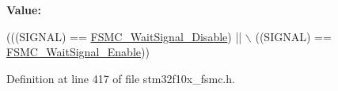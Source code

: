 {\bfseries Value\+:}
\begin{DoxyCode}
(((SIGNAL) == \hyperlink{group___f_s_m_c___wait___signal_ga6ea66c8ddee073281c421533bdff7e19}{FSMC\_WaitSignal\_Disable}) || \(\backslash\)
                                      ((SIGNAL) == \hyperlink{group___f_s_m_c___wait___signal_gaf809e339f1cdc9d0a815fd98712e9ee3}{FSMC\_WaitSignal\_Enable}))
\end{DoxyCode}


Definition at line 417 of file stm32f10x\+\_\+fsmc.\+h.

